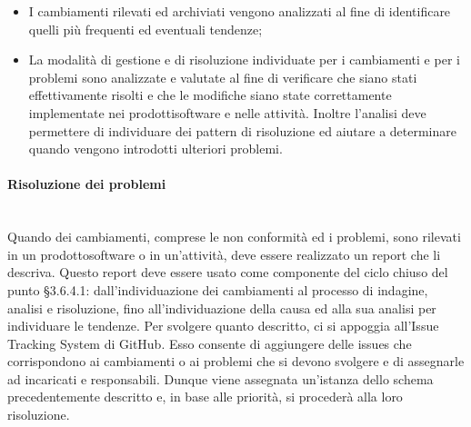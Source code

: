 \begin{itemize}
\begin{itemize}
\begin{itemize}
			\item \textbf{Conformità}: cambiamento che comporta violazioni di conformità del prodotto\glo software;
			\item \textbf{Validazione}: cambiamento riscontrato durante il processo\glosp di Validazione\glosp del prodotto\glosp software.
		\end{itemize}
		\item \textbf{Priorità}: può essere:
		\begin{itemize}
			\item bloccante;
			\item urgente;
			\item alta;
			\item media;
			\item bassa.
		\end{itemize}
		\item \textbf{Stato}: può essere:
		\begin{itemize}
			\item da fare;
			\item in corso;
			\item completato.
		\end{itemize}
	\end{itemize}
	\item I cambiamenti rilevati ed archiviati vengono analizzati al fine di identificare quelli più frequenti ed eventuali tendenze;
	\item La modalità di gestione e di risoluzione individuate per i cambiamenti e per i problemi sono analizzate e valutate al fine di verificare che siano stati effettivamente risolti e che le modifiche siano state correttamente implementate nei prodotti\glosp software e nelle attività. Inoltre l'analisi deve permettere di individuare dei pattern di risoluzione ed aiutare a determinare quando vengono introdotti ulteriori problemi.			
\end{itemize}

\paragraph{Risoluzione dei problemi}\mbox{}\\ [1mm]
Quando dei cambiamenti, comprese le non conformità ed i problemi, sono rilevati in un prodotto\glosp software o in un'attività, deve essere realizzato un report che li descriva. Questo report deve essere usato come componente del ciclo chiuso del punto §3.6.4.1: dall'individuazione dei cambiamenti al processo di indagine, analisi e risoluzione, fino all'individuazione della causa ed alla sua analisi per individuare le tendenze.
Per svolgere quanto descritto, ci si appoggia all'Issue Tracking System di GitHub. Esso consente di aggiungere delle issues che corrispondono ai cambiamenti o ai problemi che si devono svolgere e di assegnarle ad incaricati e responsabili. Dunque viene assegnata un'istanza dello schema precedentemente descritto e, in base alle priorità, si procederà alla loro risoluzione.

